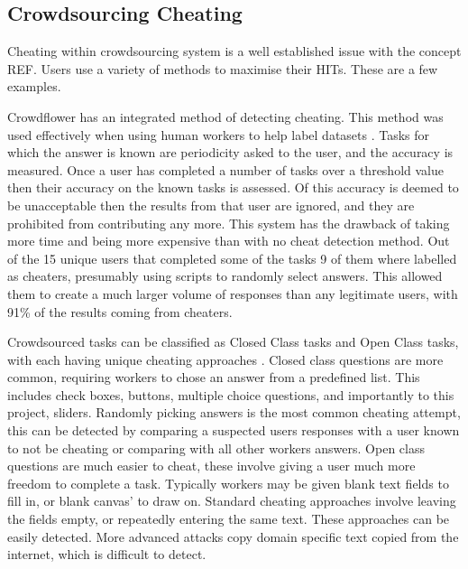 \documentclass{article}
\begin{document}

\subsection{Crowdsourcing Cheating}



Cheating within crowdsourcing system is a well established issue with the concept REF.
Users use a variety of methods to maximise their HITs.
These are a few examples.



Crowdflower has an integrated method of detecting cheating.
This method was used effectively when using human workers to help label datasets \cite{quinn2010crowdflow}.
Tasks for which the answer is known are periodicity asked to the user, and the accuracy is measured.
Once a user has completed a number of tasks over a threshold value then their accuracy on the known tasks is assessed.
Of this accuracy is deemed to be unacceptable then the results from that user are ignored, and they are prohibited from contributing any more.
This system has the drawback of taking more time and being more expensive than with no cheat detection method.
Out of the 15 unique users that completed some of the tasks 9 of them where labelled as cheaters, presumably using scripts to randomly select answers.
This allowed them to create a much larger volume of responses than any legitimate users, with 91\% of the results coming from cheaters.

Crowdsourced tasks can be classified as Closed Class tasks and Open Class tasks, with each having unique cheating approaches \cite{eickhoff2013increasing}.
Closed class questions are more common, requiring workers to chose an answer from a predefined list.
This includes check boxes, buttons, multiple choice questions, and importantly to this project, sliders.
Randomly picking answers is the most common cheating attempt, this can be detected by comparing a suspected users responses with a user known to not be cheating or comparing with all other workers answers.
Open class questions are much easier to cheat, these involve giving a user much more freedom to complete a task.
Typically workers may be given blank text fields to fill in, or blank canvas' to draw on.
Standard cheating approaches involve leaving the fields empty, or repeatedly entering the same text.
These approaches can be easily detected.
More advanced attacks copy domain specific text copied from the internet, which is difficult to detect. 
\end{document}
